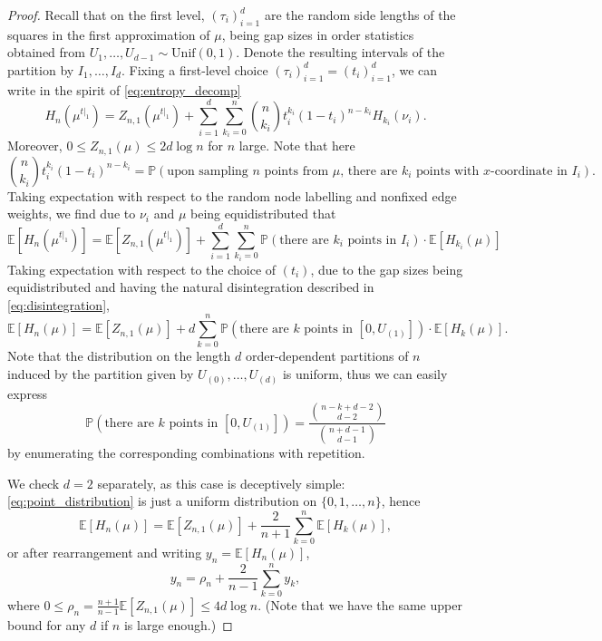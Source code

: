 \documentclass[10pt,a4paper]{amsart}
\newcommand{\EE}{\mathbb{E}}
\newcommand{\PP}{\mathbb{P}}
\newcommand{\Unif}{\mathrm{Unif}}
\begin{document}
\begin{proof}
    Recall that on the first level, $(\tau_i)_{i=1}^{d}$ are the random side lengths of the squares in the first approximation of $\mu$, being gap sizes in order statistics obtained from $U_1, \dots, U_{d-1}\sim \Unif(0, 1)$. Denote the resulting intervals of the partition by $I_1, \dots, I_d$. Fixing a first-level choice $(\tau_i)_{i=1}^{d} = (t_i)_{i=1}^{d}$, we can write in the spirit of \eqref{eq:entropy_decomp}
    \begin{equation}\label{eq:entropy_decomp2}
    H_n(\mu^{t|_1}) = Z_{n, 1}(\mu^{t|_1}) + \sum_{i=1}^{d} \sum_{k_i=0}^{n}\binom{n}{k_i} t_i^{k_i}(1-t_i)^{n-k_i}H_{k_i}(\nu_i).
    \end{equation}
    Moreover, $0\leq Z_{n, 1}(\mu) \leq 2d\log n$ for $n$ large.
    Note that here
    $$\binom{n}{k_i} t_i^{k_i}(1-t_i)^{n-k_i}=\PP(\text{upon sampling $n$ points from $\mu$, there are $k_i$ points with $x$-coordinate in $I_i$}).$$
    Taking expectation with respect to the random node labelling and nonfixed edge weights, we find due to $\nu_i$ and $\mu$ being equidistributed that
    \begin{equation}\label{eq:entropy_decomp2_expectation}
    \EE[H_n(\mu^{t|_1})]=\EE [Z_{n, 1}(\mu^{t|_1})] + \sum_{i=1}^{d}\sum_{k_i=0}^{n}\PP(\text{there are $k_i$ points in $I_i$})\cdot\EE[H_{k_i}(\mu)]
    \end{equation}
    Taking expectation with respect to the choice of $(t_i)$, due to the gap sizes being equidistributed and having the natural disintegration described in \eqref{eq:disintegration},
    $$\EE [H_n(\mu)] = \EE [Z_{n, 1}(\mu)] + d\sum_{k=0}^{n}\PP(\text{there are $k$ points in $[0, U_{(1)}]$})\cdot\EE [H_k(\mu)].$$
    Note that the distribution on the length $d$ order-dependent partitions of $n$ induced by the partition given by $U_{(0)}, \dots, U_{(d)}$ is uniform, thus we can easily express 
    \begin{equation}\label{eq:point_distribution}
    \PP(\text{there are $k$ points in $[0, U_{(1)}]$})=\frac{\binom{n-k+d-2}{d-2}}{\binom{n+d-1}{d-1}}
    \end{equation}
    by enumerating the corresponding combinations with repetition. 
    
    We check $d=2$ separately, as this case is deceptively simple: \eqref{eq:point_distribution} is just a uniform distribution on $\{0, 1, \dots, n\}$, hence
    \begin{equation}\label{eq:recursion_d=2}
    \EE [H_n(\mu)] = \EE [Z_{n, 1}(\mu)] + \frac{2}{n+1}\sum_{k=0}^{n}\EE [H_k(\mu)],
    \end{equation}
    or after rearrangement and writing $y_n=\EE [H_n(\mu)]$,
    $$y_n = \rho_n + \frac{2}{n-1}\sum_{k=0}^{n}y_k,$$
    where $0\leq \rho_n = \frac{n+1}{n-1}\EE [Z_{n, 1}(\mu)]\leq 4d\log n$. (Note that we have the same upper bound for any $d$ if $n$ is large enough.)
    

\end{proof}
\end{document}
